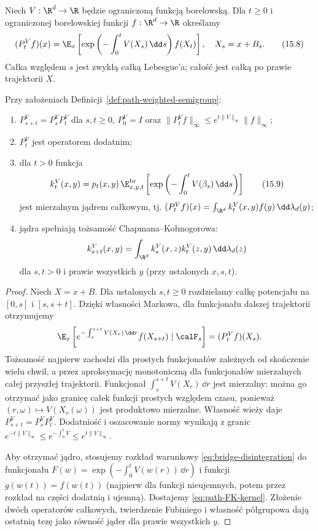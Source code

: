 \begin{definicja}
\label{def:path-weighted-semigroup}
Niech $V:\R^d\to\R$ będzie ograniczoną funkcją borelowską.
Dla $t\ge0$ i ograniczonej borelowskiej funkcji
$f:\R^d\to\R$ określamy
\[
 (P_t^Vf)(x)=\E_x\left[
 \exp\left(-\int_0^tV(X_s)\,\dd s\right)f(X_t)\right],
 \quad X_s=x+B_s.
\tag{15.8}\label{eq:path-FK-semigroup}
\]
Całka względem $s$ jest zwykłą całką Lebesgue'a;
całość jest całką po prawie trajektorii $X$.
\end{definicja}

\begin{twierdzenie}
\label{th:path-FK-kernel}
Przy założeniach Definicji~\ref{def:path-weighted-semigroup}:
\begin{enumerate}
\item $P_{s+t}^V=P_s^VP_t^V$ dla $s,t\ge0$,
$P_0^V=I$ oraz
$\|P_t^V f\|_\infty\le e^{t\|V\|_\infty}\|f\|_\infty$;
\item $P_t^V$ jest operatorem dodatnim;
\item dla $t>0$ funkcja
\[
 k_t^V(x,y)=p_t(x,y)\,
 \E_{x,y,t}^{\mathrm{br}}\left[
   \exp\left(-\int_0^tV(\beta_s)\,\dd s\right)\right]
 \tag{15.9}\label{eq:path-FK-kernel}
\]
jest mierzalnym jądrem całkowym, tj.
$(P_t^Vf)(x)=\int_{\R^d}k_t^V(x,y)f(y)\,\dd\lambda_d(y)$;
\item jądra spełniają tożsamość Chapmana--Kołmogorowa:
\[
 k_{s+t}^V(x,y)=\int_{\R^d}k_s^V(x,z)k_t^V(z,y)
 \,\dd\lambda_d(z)
\]
dla $s,t>0$ i prawie wszystkich $y$
(przy ustalonych $x,s,t$).
\end{enumerate}
\end{twierdzenie}
\begin{proof}
Niech $X=x+B$. Dla ustalonych $s,t\ge0$ rozdzielamy
całkę potencjału na $[0,s]$ i $[s,s+t]$. Dzięki własności
Markowa, dla funkcjonału dalszej trajektorii otrzymujemy
\[
 \E_x\left[e^{-\int_s^{s+t}V(X_r)\,\dd r}
    f(X_{s+t})\mid\calF_s\right]=(P_t^V f)(X_s).
\]
Tożsamość najpierw zachodzi dla prostych funkcjonałów
zależnych od skończenie wielu chwil, a przez aproksymację
monotoniczną dla funkcjonałów mierzalnych całej przyszłej
trajektorii. Funkcjonał $\int_s^{s+t}V(X_r)\,\dd r$
jest mierzalny: można go otrzymać jako granicę całek
funkcji prostych względem czasu, ponieważ
$(r,\omega)\mapsto V(X_r(\omega))$ jest produktowo
mierzalne. Własność wieży daje $P_{s+t}^V=P_s^VP_t^V$.
Dodatniość i oszacowanie normy wynikają z granic
$e^{-t\|V\|_\infty}\le e^{-\int_0^tV}\le e^{t\|V\|_\infty}$.

Aby otrzymać jądro, stosujemy rozkład warunkowy
\eqref{eq:bridge-disintegration} do funkcjonału
$F(w)=\exp(-\int_0^tV(w(r))\,\dd r)$
i funkcji $g(w(t))=f(w(t))$ (najpierw dla funkcji
nieujemnych, potem przez rozkład na części dodatnią
i ujemną). Dostajemy \eqref{eq:path-FK-kernel}.
Złożenie dwóch operatorów całkowych, twierdzenie
Fubiniego i własność półgrupowa dają ostatnią tezę
jako równość jąder dla prawie wszystkich $y$.
\end{proof}

